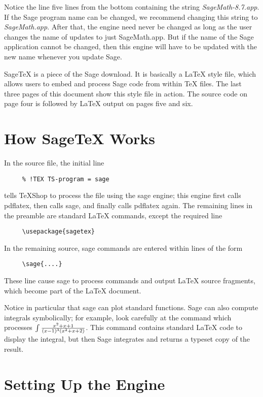 \documentclass[11pt, oneside]{amsart}
\begin{document}
Notice the line five lines from the bottom containing the string {\em SageMath-8.7.app}. If the Sage program name can be changed, we recommend changing this string to {\em SageMath.app}. After that, the engine need never be changed as long as the user changes the name of updates to just SageMath.app. But if the name of the Sage application cannot be changed, then this engine will have to be updated with the new name whenever you update Sage.


SageTeX is a piece of the Sage download. It is basically a LaTeX style file, which  allows users to embed and process Sage code from within TeX files. The last three pages of this document show this style file in action. The source code on page four is followed by LaTeX output on pages five and six.

\section{How SageTeX Works}

 In the source file, the initial line
\begin{verbatim}
     % !TEX TS-program = sage
\end{verbatim}
tells TeXShop to process the file using the sage engine; this engine first calls pdflatex, then calls sage, and finally calls pdflatex again.
The remaining lines in the preamble are standard LaTeX commands, except the required line
\begin{verbatim}
     \usepackage{sagetex}
\end{verbatim}
In the remaining source, sage commands are entered within lines of the form
\begin{verbatim}
     \sage{....}
\end{verbatim}
These line cause sage to process commands and output LaTeX source fragments, which become part of the LaTeX document.

Notice in particular that sage can plot standard functions. Sage can also compute integrals symbolically; for example, look carefully at the command which processes $\int {{x^2 + x + 1} \over {(x - 1)^3 (x^2 + x + 2)}}$. This command contains standard LaTeX code to display the integral, but then Sage integrates and returns a typeset copy of the result.


\section{Setting Up the Engine}
\end{document}
